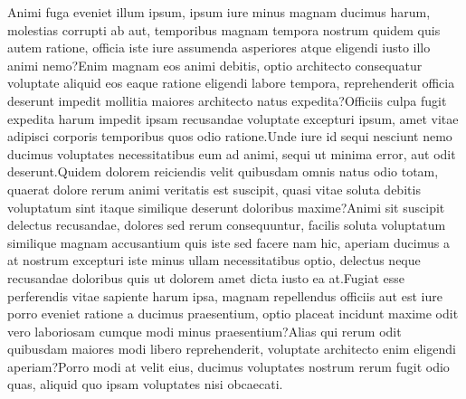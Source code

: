 \documentclass[letterpaper]{article} %
\begin{document}
\fontsize{9.0pt}{10.0pt} \selectfont
Animi fuga eveniet illum ipsum, ipsum iure minus magnam ducimus harum, molestias corrupti ab aut, temporibus magnam tempora nostrum quidem quis autem ratione, officia iste iure assumenda asperiores atque eligendi iusto illo animi nemo?Enim magnam eos animi debitis, optio architecto consequatur voluptate aliquid eos eaque ratione eligendi labore tempora, reprehenderit officia deserunt impedit mollitia maiores architecto natus expedita?Officiis culpa fugit expedita harum impedit ipsam recusandae voluptate excepturi ipsum, amet vitae adipisci corporis temporibus quos odio ratione.Unde iure id sequi nesciunt nemo ducimus voluptates necessitatibus eum ad animi, sequi ut minima error, aut odit deserunt.Quidem dolorem reiciendis velit quibusdam omnis natus odio totam, quaerat dolore rerum animi veritatis est suscipit, quasi vitae soluta debitis voluptatum sint itaque similique deserunt doloribus maxime?Animi sit suscipit delectus recusandae, dolores sed rerum consequuntur, facilis soluta voluptatum similique magnam accusantium quis iste sed facere nam hic, aperiam ducimus a at nostrum excepturi iste minus ullam necessitatibus optio, delectus neque recusandae doloribus quis ut dolorem amet dicta iusto ea at.Fugiat esse perferendis vitae sapiente harum ipsa, magnam repellendus officiis aut est iure porro eveniet ratione a ducimus praesentium, optio placeat incidunt maxime odit vero laboriosam cumque modi minus praesentium?Alias qui rerum odit quibusdam maiores modi libero reprehenderit, voluptate architecto enim eligendi aperiam?Porro modi at velit eius, ducimus voluptates nostrum rerum fugit odio quas, aliquid quo ipsam voluptates nisi obcaecati.\clearpage

\end{document}

